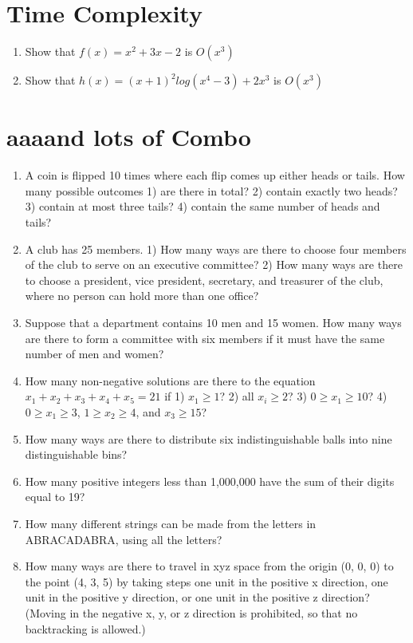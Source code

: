 \documentclass{article}
\begin{document}
\section{Time Complexity}

\begin{enumerate}[label=\alph*.]

\item Show that $f(x) = x^{2} + 3x - 2$ is $O(x^{3})$
\item Show that $h(x) = (x+1)^{2}log(x^4 - 3) + 2x^{3}$ is $O(x^{3})$

\end{enumerate}

\section{aaaand lots of Combo}
\begin{enumerate}
    \item A coin is flipped 10 times where each flip comes up either heads or tails. How many possible outcomes 1) are there in total? 2) contain exactly two heads? 3) contain at most three tails? 4) contain the same number of heads and tails?
    \item A club has 25 members. 1) How many ways are there to choose four members of the club to serve on an executive committee? 2) How many ways are there to choose a president, vice president, secretary, and treasurer of the club, where no person can hold more than one office?
    \item Suppose that a department contains 10 men and 15 women. How many ways are there to form a committee with six members if it must have the same number of men and women?
    \item How many non-negative solutions are there to the equation $x_1 + x_2 + x_3 + x_4 + x_5 = 21$ if 1) $x_1 \geq 1$? 2) all $x_i \geq 2$? 3) $0 \geq x_1 \geq 10$? 4) $0 \geq x_1 \geq 3$, $1 \geq x_2 \geq 4$, and $x_3 \geq 15$?
    \item How many ways are there to distribute six indistinguishable balls into nine distinguishable bins?
    \item How many positive integers less than 1,000,000 have the sum of their digits equal to 19?
    \item How many different strings can be made from the letters in ABRACADABRA, using all the letters?
    \item How many ways are there to travel in xyz space from the origin (0, 0, 0) to the point (4, 3, 5) by taking steps one unit in the positive x direction, one unit in the positive y direction, or one unit in the positive z direction? (Moving in the negative x, y, or z direction is prohibited, so that no backtracking is allowed.)
\end{enumerate}
\end{document}
